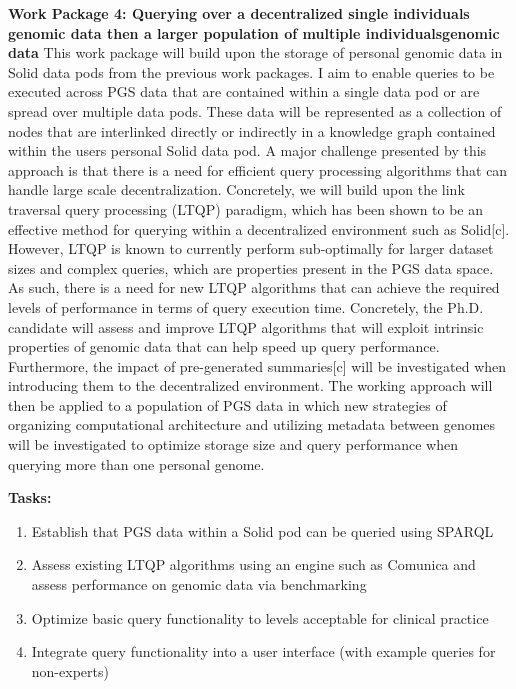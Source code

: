 \documentclass[11pt]{article}
\begin{document}
\textbf{Work Package 4: Querying over a decentralized single individual\textquotesingle s genomic data then a larger population of multiple individuals\textquotesingle  genomic data}
This work package will build upon the storage of personal genomic data in Solid data pods from the previous work packages. 
I aim to enable queries to be executed across PGS data that are contained within a single data pod or are spread over multiple data pods. 
These data will be represented as a collection of nodes that are interlinked directly or indirectly in a knowledge graph contained within the user\textquotesingle s personal Solid data pod. 
A major challenge presented by this approach is that there is a need for efficient query processing algorithms that can handle large scale decentralization. 
Concretely, we will build upon the link traversal query processing (LTQP) paradigm, which has been shown to be an effective method for querying within a decentralized environment such as Solid[c]. 
However, LTQP is known to currently perform sub-optimally for larger dataset sizes and complex queries, which are properties present in the PGS data space. 
As such, there is a need for new LTQP algorithms that can achieve the required levels of performance in terms of query execution time. 
Concretely, the Ph.D. candidate will assess and improve LTQP algorithms that will exploit intrinsic properties of genomic data that can help speed up query performance. 
Furthermore, the impact of pre-generated summaries[c] will be investigated when introducing them to the decentralized environment. 
The working approach will then be applied to a population of PGS data in which new strategies of organizing computational architecture and utilizing metadata between genomes will be investigated to optimize storage size and query performance when querying more than one personal genome.

\textbf{Tasks:} 
\begin{enumerate}
	\item Establish that PGS data within a Solid pod can be queried using SPARQL
	\item Assess existing LTQP algorithms using an engine such as Comunica and assess performance on genomic data via benchmarking
	\item Optimize basic query functionality to levels acceptable for clinical practice
	\item Integrate query functionality into a user interface (with example queries for non-experts)
\end{enumerate}
\end{document}
